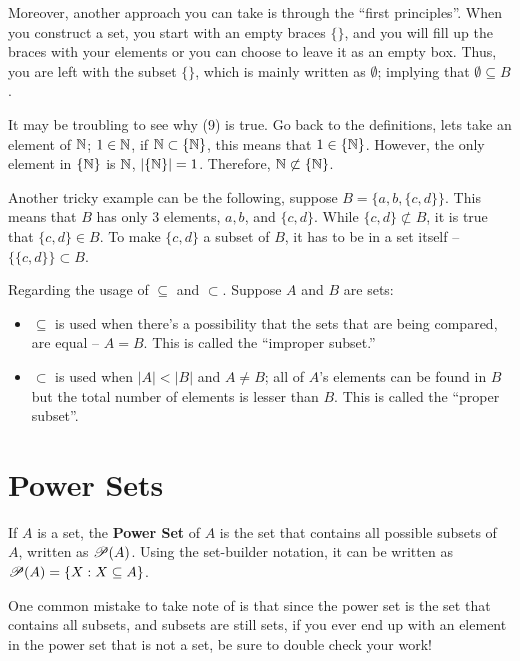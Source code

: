 \documentclass[../Latex-Setup/setup.tex]{subfiles}
\begin{document}
\indent Moreover, another approach you can take is through the ``first principles''. When you construct a set, you start with an empty braces $\{\}$,
and you will fill up the braces with your elements or you can choose to leave it as an empty box. Thus, you are left with the subset $\{\}$,
which is mainly written as $\emptyset$; implying that $\emptyset \subseteq B$.\par

\indent It may be troubling to see why (9) is true. Go back to the definitions, lets take an element of $\mathbb N$;
$1 \in \mathbb N$, if $\mathbb N \subset \{\mathbb N\}$, this means that $1 \in \{\mathbb N\}$. However, the only element in $\{\mathbb N\}$ is $\mathbb N$, $|\{\mathbb N\}| = 1$.
Therefore, $\mathbb N \not\subset \{\mathbb N\}$.\par

\indent Another tricky example can be the following, suppose $B = \{a,b,\{c,d\}\}$. This means that $B$ has only $3$ elements, $a,b$, and $\{c,d\}$.
While $\{c,d\} \not\subset B$, it is true that $\{c,d\} \in B$. To make $\{c,d\}$ a subset of $B$, it has to be in a set itself -- $\{\{c,d\}\} \subset B$.\par

\begin{remark}
    Regarding the usage of $\subseteq$ and $\subset$. Suppose $A$ and $B$ are sets:\par
    \begin{itemize}
        \item $\subseteq$ is used when there's a possibility that the sets that are being compared, are equal -- $A = B$. This is called the ``improper subset.''
        \item $\subset$ is used when $|A| < |B|$ and $A \neq B$; all of $A$'s elements can be found in $B$ but the total number of elements is lesser than $B$. This is called the ``proper subset''.
    \end{itemize}
\end{remark}


\section{Power Sets}

\indent If $A$ is a set, the \textbf{Power Set} of $A$ is the set that contains all possible subsets of $A$, written as $\mathscr P(A)$.
Using the set-builder notation, it can be written as $\mathscr P(A) = \{X : X \subseteq A\}$.\par

\indent One common mistake to take note of is that since the power set is the set that contains all subsets, and subsets are still sets,
if you ever end up with an element in the power set that is not a set, be sure to double check your work!\par
\end{document}

